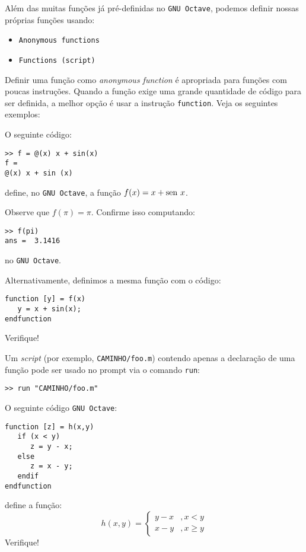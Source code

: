 Além das muitas funções já pré-definidas no \verb+GNU Octave+, podemos definir nossas próprias funções usando:
\begin{itemize}
\item \verb+Anonymous functions+
\item \verb+Functions (script)+
\end{itemize}

Definir uma função como \emph{anonymous function} é apropriada para funções com poucas instruções. Quando a função exige uma grande quantidade de código para ser definida, a melhor opção é usar a instrução \verb+function+. Veja os seguintes exemplos:

\begin{ex}
  O seguinte código:
\begin{verbatim}
>> f = @(x) x + sin(x)
f =
@(x) x + sin (x)
\end{verbatim}
define, no \verb+GNU Octave+, a função $f(x) = x + \operatorname{sen}\, x$.

Observe que $f(\pi) = \pi$. Confirme isso computando:
\begin{verbatim}
>> f(pi)
ans =  3.1416
\end{verbatim}
no \verb+GNU Octave+.

Alternativamente, definimos a mesma função com o código:
\begin{verbatim}
function [y] = f(x)
   y = x + sin(x);
endfunction
\end{verbatim}
Verifique!
\end{ex}

\begin{obs}
  Um {\it script} (por exemplo, \verb+CAMINHO/foo.m+) contendo apenas a declaração de uma função pode ser usado no prompt via o comando \verb+run+:
\begin{verbatim}
>> run "CAMINHO/foo.m"
\end{verbatim}
\end{obs}

\begin{ex}
  O seguinte código \verb+GNU Octave+:
\begin{verbatim}
function [z] = h(x,y)
   if (x < y)
      z = y - x;
   else
      z = x - y;
   endif
endfunction
\end{verbatim}
define a função:
\begin{equation}
  h(x,y) = \left\{
    \begin{array}{ll}
      y - x &, x < y\\
      x - y &, x \geq y
    \end{array}
\right.
\end{equation}
Verifique!
\end{ex}

